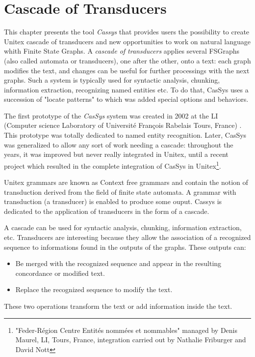 \chapter{Cascade of Transducers}
\label{chap-cassys}

This chapter presents the tool \textit{Cassys} that provides users the possibility to create Unitex cascade of transducers and new opportunities to work on natural language whith Finite State Graphs. A \textit{cascade of transducers}  applies several FSGraphs (also called automata or transducers), one after the other, onto a text: each graph modifies the text, and changes can be useful for further processings with the next graphs. Such a system is typically used for syntactic analysis, chunking, information extraction, recognizing named entities etc. To do that, CasSys uses a succession of "locate patterns" to which was added special options and behaviors.

\bigskip
\noindent The first prototype of the \textit{CasSys}  system was created in 2002 at the LI 
(Computer science Laboratory of Université François Rabelais Tours, France) \cite{these-nathalie}. This prototype was totally  dedicated to named entity recognition. Later, CasSys was generalized to allow any sort of work needing a cascade: throughout the years,  it was improved but never really integrated in Unitex, until a recent project which resulted in the complete integration of CasSys in Unitex\footnote{"Feder-Région Centre Entités  nommées et nommables" managed by Denis Maurel, LI, Tours, France, integration carried out by Nathalie Friburger and David Nott}.


Unitex grammars are known as Context free grammars and contain the notion of transduction derived from the field 
of finite state automata. A grammar with transduction (a transducer) is enabled to produce some ouput. 
Cassys is dedicated to the application of transducers in the form of a cascade.

\bigskip
A cascade can be used for syntactic analysis, chunking, information extraction, etc. 
\noindent Transducers are interesting because they allow the association of a recognized sequence to informations found in the outputs of the graphs. 
These outputs can:
\begin{itemize}
	\item	Be merged with the recognized sequence and appear in the resulting concordance or modified text. 
	\item	Replace the recognized sequence to modify the text. 
\end{itemize}
\noindent These two operations transform the text or add information inside the text. 


